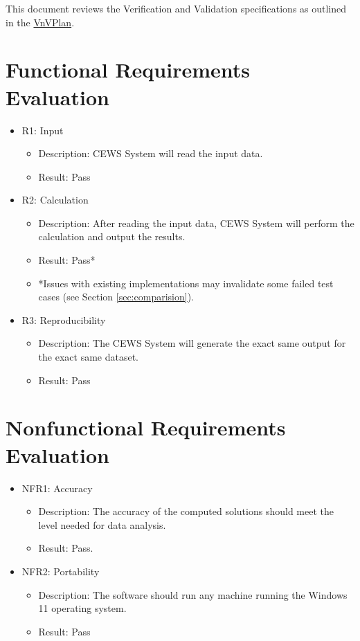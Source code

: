 \documentclass[12pt, titlepage]{article}
\begin{document}

\newpage


This document reviews the Verification and Validation specifications as
outlined in the \href{https://github.com/LesleyWheat/CAS741_CEWS/blob/main/docs/VnVPlan/VnVPlan.pdf}{VnVPlan}.

\section{Functional Requirements Evaluation}

\begin{itemize}
    \item R1: Input
    \begin{itemize}
    \item Description: CEWS System will read the input data.
    \item Result: Pass
    \end{itemize}
    \item R2: Calculation
    \begin{itemize}
    \item Description: After reading the input data, CEWS System will perform the calculation and output the results.
    \item Result: Pass*
    \item *Issues with existing implementations may invalidate some failed test cases (see Section \ref{sec:comparision}).
    \end{itemize}
    \item R3: Reproducibility
    \begin{itemize}
    \item Description: The CEWS System will generate the exact same output for the exact same dataset.
    \item Result: Pass
    \end{itemize}
\end{itemize}


\section{Nonfunctional Requirements Evaluation}

\begin{itemize}
    \item NFR1: Accuracy 
    \begin{itemize}
    \item Description: The accuracy of the computed solutions should meet the level needed for data analysis.
    \item Result: Pass.
    \end{itemize}
    \item NFR2: Portability 
    \begin{itemize}
    \item Description: The software should run any machine running the Windows 11 operating system.
    \item Result: Pass
    \end{itemize}
\end{itemize}
\end{document}
